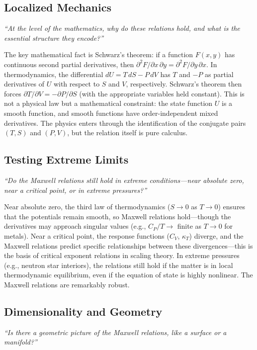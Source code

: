 \subsection*{Localized Mechanics}
\textit{``At the level of the mathematics, why do these relations hold, and what is the essential structure they encode?''}

The key mathematical fact is Schwarz's theorem: if a function $F(x,y)$ has continuous second partial derivatives, then $\partial^{2}F/\partial x\,\partial y = \partial^{2}F/\partial y\,\partial x$. In thermodynamics, the differential $dU = T\,dS - P\,dV$ has $T$ and $-P$ as partial derivatives of $U$ with respect to $S$ and $V$, respectively. Schwarz's theorem then forces $\partial T/\partial V = -\partial P/\partial S$ (with the appropriate variables held constant). This is not a physical law but a mathematical constraint: the state function $U$ is a smooth function, and smooth functions have order-independent mixed derivatives. The physics enters through the identification of the conjugate pairs $(T, S)$ and $(P, V)$, but the relation itself is pure calculus.

\subsection*{Testing Extreme Limits}
\textit{``Do the Maxwell relations still hold in extreme conditions---near absolute zero, near a critical point, or in extreme pressures?''}

Near absolute zero, the third law of thermodynamics ($S \to 0$ as $T \to 0$) ensures that the potentials remain smooth, so Maxwell relations hold---though the derivatives may approach singular values (e.g., $C_{P}/T \to$ finite as $T \to 0$ for metals). Near a critical point, the response functions ($C_{V}$, $\kappa_{T}$) diverge, and the Maxwell relations predict specific relationships between these divergences---this is the basis of critical exponent relations in scaling theory. In extreme pressures (e.g., neutron star interiors), the relations still hold if the matter is in local thermodynamic equilibrium, even if the equation of state is highly nonlinear. The Maxwell relations are remarkably robust.

\subsection*{Dimensionality and Geometry}
\textit{``Is there a geometric picture of the Maxwell relations, like a surface or a manifold?''}

